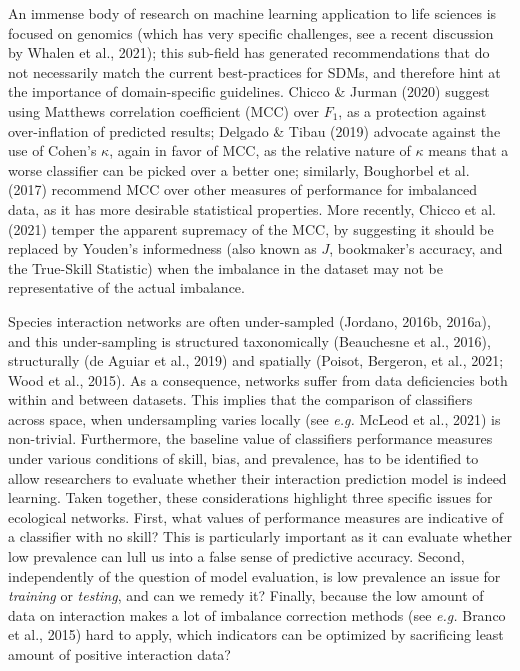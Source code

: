 \documentclass[11pt]{article}
\begin{document}
An immense body of research on machine learning application to life
sciences is focused on genomics (which has very specific challenges, see
a recent discussion by Whalen et al., 2021); this sub-field has
generated recommendations that do not necessarily match the current
best-practices for SDMs, and therefore hint at the importance of
domain-specific guidelines. Chicco \& Jurman (2020) suggest using
Matthews correlation coefficient (MCC) over \(F_1\), as a protection
against over-inflation of predicted results; Delgado \& Tibau (2019)
advocate against the use of Cohen's \(\kappa\), again in favor of MCC,
as the relative nature of \(\kappa\) means that a worse classifier can
be picked over a better one; similarly, Boughorbel et al. (2017)
recommend MCC over other measures of performance for imbalanced data, as
it has more desirable statistical properties. More recently, Chicco et
al. (2021) temper the apparent supremacy of the MCC, by suggesting it
should be replaced by Youden's informedness (also known as \(J\),
bookmaker's accuracy, and the True-Skill Statistic) when the imbalance
in the dataset may not be representative of the actual imbalance.

Species interaction networks are often under-sampled (Jordano, 2016b,
2016a), and this under-sampling is structured taxonomically (Beauchesne
et al., 2016), structurally (de Aguiar et al., 2019) and spatially
(Poisot, Bergeron, et al., 2021; Wood et al., 2015). As a consequence,
networks suffer from data deficiencies both within and between datasets.
This implies that the comparison of classifiers across space, when
undersampling varies locally (see \emph{e.g.} McLeod et al., 2021) is
non-trivial. Furthermore, the baseline value of classifiers performance
measures under various conditions of skill, bias, and prevalence, has to
be identified to allow researchers to evaluate whether their interaction
prediction model is indeed learning. Taken together, these
considerations highlight three specific issues for ecological networks.
First, what values of performance measures are indicative of a
classifier with no skill? This is particularly important as it can
evaluate whether low prevalence can lull us into a false sense of
predictive accuracy. Second, independently of the question of model
evaluation, is low prevalence an issue for \emph{training} or
\emph{testing}, and can we remedy it? Finally, because the low amount of
data on interaction makes a lot of imbalance correction methods (see
\emph{e.g.} Branco et al., 2015) hard to apply, which indicators can be
optimized by sacrificing least amount of positive interaction data?
\end{document}
